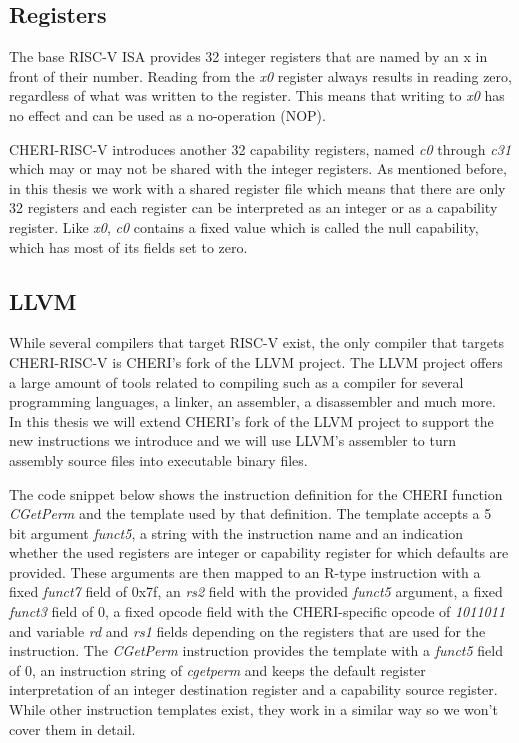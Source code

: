 \subsection{Registers}
The base RISC-V ISA provides 32 integer registers that are named by an x in front of their number.
Reading from the \textit{x0} register always results in reading zero, regardless of what was written to the register.
This means that writing to \textit{x0} has no effect and can be used as a no-operation (NOP).

CHERI-RISC-V introduces another 32 capability registers, named \textit{c0} through \textit{c31} which may or may not be shared with the integer registers.
As mentioned before, in this thesis we work with a shared register file which means that there are only 32 registers and each register can be interpreted as an integer or as a capability register.
Like \textit{x0}, \textit{c0} contains a fixed value which is called the null capability, which has most of its fields set to zero.


\subsection{LLVM}
\label{sec:llvm_background}
While several compilers that target RISC-V exist, the only compiler that targets CHERI-RISC-V is CHERI's fork of the LLVM project.
The LLVM project offers a large amount of tools related to compiling such as a compiler for several programming languages, a linker, an assembler, a disassembler and much more.
In this thesis we will extend CHERI's fork of the LLVM project to support the new instructions we introduce and we will use LLVM's assembler to turn assembly source files into executable binary files.

The code snippet below shows the instruction definition for the CHERI function \textit{CGetPerm} and the template used by that definition.
The template accepts a 5 bit argument \textit{funct5}, a string with the instruction name and an indication whether the used registers are integer or capability register for which defaults are provided.
These arguments are then mapped to an R-type instruction with a fixed \textit{funct7} field of 0x7f, an \textit{rs2} field with the provided \textit{funct5} argument, a fixed \textit{funct3} field of 0, a fixed opcode field with the CHERI-specific opcode of \textit{1011011} and variable \textit{rd} and \textit{rs1} fields depending on the registers that are used for the instruction.
The \textit{CGetPerm} instruction provides the template with a \textit{funct5} field of 0, an instruction string of \textit{cgetperm} and keeps the default register interpretation of an integer destination register and a capability source register.
While other instruction templates exist, they work in a similar way so we won't cover them in detail.

